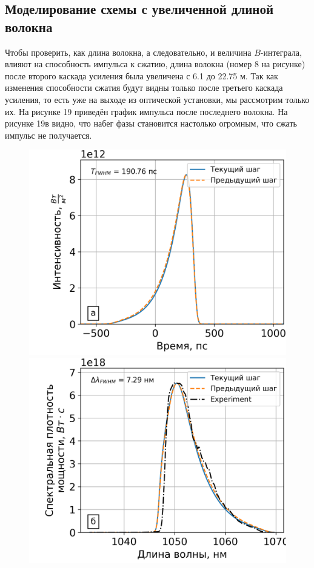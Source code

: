 \documentclass[12pt]{article}
\begin{document}
\subsection{Моделирование схемы с увеличенной длиной волокна}

Чтобы проверить, как длина волокна, а следовательно, и величина $B$-интеграла, влияют на способность импульса к сжатию,
длина волокна (номер 8 на рисунке) после второго каскада усиления была увеличена с 6.1 до 22.75 м. Так как изменения
способности сжатия будут видны только после третьего каскада усиления, то есть уже на выходе из оптической установки, мы
рассмотрим только их. На рисунке 19 приведён график импульса после последнего волокна. На рисунке 19в видно, что набег
фазы становится настолько огромным, что сжать импульс не получается.

\begin{figure}[h!]
  \centering
  \begin{minipage}[b]{0.5\textwidth}
    \includegraphics[width=\linewidth]{Images/Gauss Pulse x10/!23. Fiber_pusle}
  \end{minipage}%
  \begin{minipage}[b]{0.5\textwidth}
    \includegraphics[width=\linewidth]{Images/Gauss Pulse x10/!23. Fiber_spectrum}

\end{minipage}
\end{figure}
\end{document}
